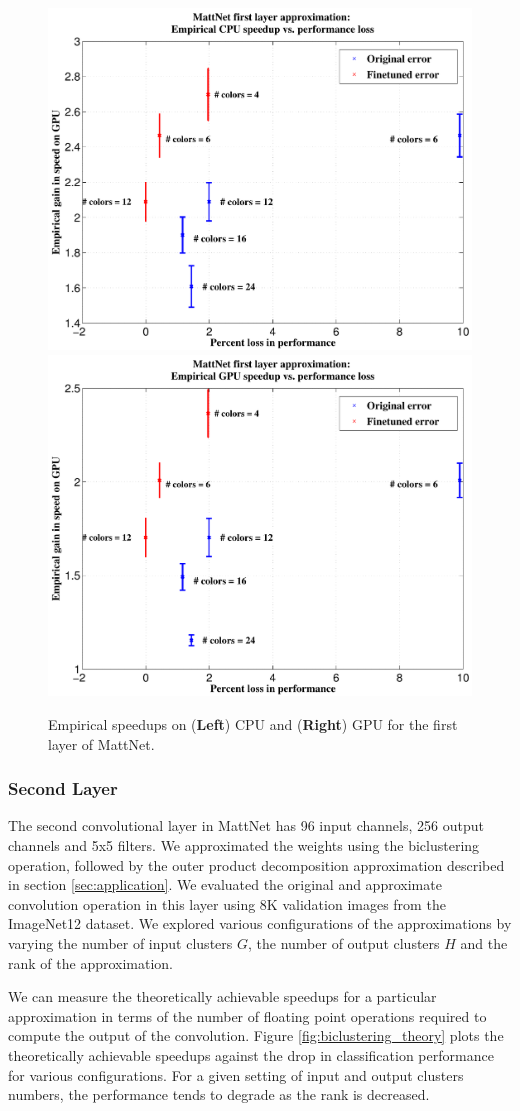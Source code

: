 \begin{figure}[t]
\centering
\begin{minipage}{0.75\textwidth}
      \includegraphics[width=0.5\linewidth]{img/layer1_CPUspeedup_vs_performance_loss_finetune_and_orig.pdf}
	\quad\quad
      \includegraphics[width=0.5\linewidth]{img/layer1_GPUspeedup_vs_performance_loss_finetune_and_orig.pdf}
\end{minipage}
\caption{Empirical speedups on ({\bf Left}) CPU and ({\bf Right}) GPU for the first layer of MattNet.}
\label{fig:mono_speedups}
\end{figure}

\subsubsection{Second Layer}
The second convolutional layer in MattNet has 96 input channels, 256 output channels and 5x5 filters. 
We approximated the weights using the biclustering operation,
followed by the outer product decomposition approximation described in section \ref{sec:application}.
We evaluated the original and approximate convolution operation in
this layer using 8K validation images from the ImageNet12 dataset. 
We explored various configurations of the approximations by varying the number of input clusters $G$, the number of output clusters $H$ and the rank of the approximation. 

We can measure the theoretically achievable speedups for a particular approximation in terms of the number of floating point operations required to compute the output of the convolution. Figure \ref{fig:biclustering_theory} plots the theoretically achievable speedups against the drop in classification performance for various configurations.  
For a given setting of input and output clusters numbers, the performance tends to degrade as the rank is decreased. 

